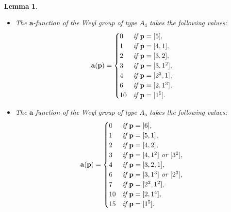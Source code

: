 \documentclass[reqno,12pt]{amsart}
\numberwithin{equation}{section}
\theoremstyle{plain}
\newtheorem{Lem}[Thm]{Lemma}
\theoremstyle{definition}
\newcommand{\aff}{ \mathbf{a} }
\begin{document}
\begin{Lem}
\begin{itemize}
\item [(4)]
 The  $\aff$-function of the Weyl group of type $ A_4$  takes the following values:
  $$\aff({\bf p})=\begin{cases}
	0 &\emph{if }{\bf p}=[5],\\
	1 &\emph{if }{\bf p}=[4,1],\\
 2 &\emph{if }{\bf p}=[3,2],\\
 3 &\emph{if }{\bf p}=[3,1^2],\\
 4 &\emph{if }{\bf p}=[2^2,1],\\
 6 &\emph{if }{\bf p}=[2,1^3],\\
 10 &\emph{if }{\bf p}=[1^5].\\
	\end{cases}
 $$





\item [(5)]
 The  $\aff$-function of the Weyl group of type $ A_5$  takes the following values:
$$\aff({\bf p})=\begin{cases}
	0 &\emph{if }{\bf p}=[6],\\
	1 &\emph{if }{\bf p}=[5,1],\\
 2 &\emph{if }{\bf p}=[4,2],\\
 3 &\emph{if }{\bf p}=[4,1^2] \emph{~or~} [3^2],\\
 4 &\emph{if }{\bf p}=[3,2,1],\\
 6 &\emph{if }{\bf p}=[3,1^3] \emph{~or~} [2^3], \\
 7 &\emph{if }{\bf p}=[2^2,1^2], \\
10 &\emph{if }{\bf p}=[2,1^4],\\
15 &\emph{if }{\bf p}=[1^5].\\
	\end{cases}
 $$






\end{itemize}
\end{Lem}
\end{document}
